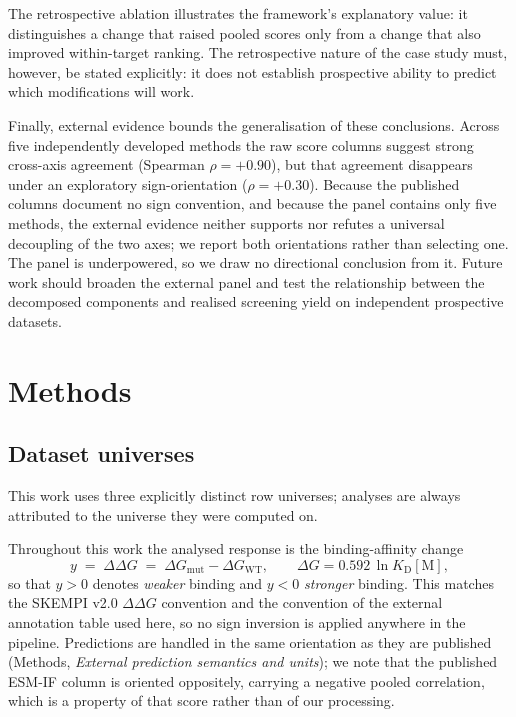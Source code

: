\documentclass[11pt,a4paper]{article}
\begin{document}
The retrospective ablation illustrates the framework's explanatory value: it distinguishes
a change that raised pooled scores only from a change that also improved within-target
ranking. The retrospective nature of the case study must, however, be stated explicitly: it
does not establish prospective ability to predict which modifications will work.

Finally, external evidence bounds the generalisation of these conclusions. Across five independently developed methods the raw score columns suggest strong cross-axis
agreement (Spearman $\rho = +0.90$), but that agreement disappears under an
exploratory sign-orientation ($\rho = +0.30$). Because the published columns
document no sign convention, and because the panel contains only five methods, the external
evidence neither supports nor refutes a universal decoupling of the two axes; we report both
orientations rather than selecting one. The panel is underpowered, so we draw no directional
conclusion from it. Future work should broaden the external panel and test the relationship
between the decomposed components and realised screening yield on independent prospective
datasets.

\section{Methods}
\subsection*{Dataset universes}
This work uses three explicitly distinct row universes; analyses are always attributed to
the universe they were computed on.

Throughout this work the analysed response is the binding-affinity change
\begin{equation}
  y \;=\; \Delta\Delta G \;=\; \Delta G_{\mathrm{mut}} - \Delta G_{\mathrm{WT}},
  \qquad \Delta G = 0.592\,\ln K_{\mathrm{D}}[\mathrm{M}],
  \label{eq:sign}
\end{equation}
so that $y > 0$ denotes \emph{weaker} binding and $y < 0$ \emph{stronger} binding. This
matches the SKEMPI v2.0 $\Delta\Delta G$ convention and the convention of the external
annotation table used here, so no sign inversion is applied anywhere in the pipeline.
Predictions are handled in the same orientation as they are published (Methods,
\emph{External prediction semantics and units}); we note that the published ESM-IF column
is oriented oppositely, carrying a negative pooled correlation, which is a property of that
score rather than of our processing.
\end{document}
